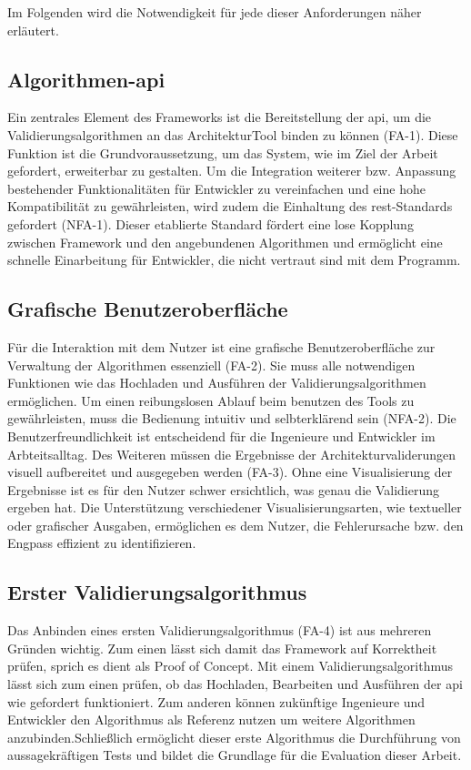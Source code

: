Im Folgenden wird die Notwendigkeit für jede dieser Anforderungen näher erläutert.

\subsection*{Algorithmen-\gls{api}}

Ein zentrales Element des Frameworks ist die Bereitstellung der \gls{api}, um die Validierungsalgorithmen an das ArchitekturTool binden zu können (FA-1). Diese Funktion ist die Grundvoraussetzung, um das System, wie im Ziel der Arbeit gefordert, erweiterbar zu gestalten. Um die Integration weiterer bzw. Anpassung bestehender Funktionalitäten für Entwickler zu vereinfachen und eine hohe Kompatibilität zu gewährleisten, wird zudem die Einhaltung des \gls{rest}-Standards gefordert (NFA-1). Dieser etablierte Standard fördert eine lose Kopplung zwischen Framework und den angebundenen Algorithmen und ermöglicht eine schnelle Einarbeitung für Entwickler, die nicht vertraut sind mit dem Programm.

\subsection*{Grafische Benutzeroberfläche}

Für die Interaktion mit dem Nutzer ist eine grafische Benutzeroberfläche zur Verwaltung der Algorithmen essenziell (FA-2). Sie muss alle notwendigen Funktionen wie das Hochladen und Ausführen der Validierungsalgorithmen ermöglichen. Um einen reibungslosen Ablauf beim benutzen des Tools zu gewährleisten, muss die Bedienung intuitiv und selbterklärend sein (NFA-2). Die Benutzerfreundlichkeit ist entscheidend für die Ingenieure und Entwickler im Arbteitsalltag. Des Weiteren müssen die Ergebnisse der Architekturvaliderungen visuell aufbereitet und ausgegeben werden (FA-3). Ohne eine Visualisierung der Ergebnisse ist es für den Nutzer schwer ersichtlich, was genau die Validierung ergeben hat. Die Unterstützung verschiedener Visualisierungsarten, wie textueller oder grafischer Ausgaben, ermöglichen es dem Nutzer, die Fehlerursache bzw. den Engpass effizient zu identifizieren.

\subsection*{Erster Validierungsalgorithmus}

Das Anbinden eines ersten Validierungsalgorithmus (FA-4) ist aus mehreren Gründen wichtig. Zum einen lässt sich damit das Framework auf Korrektheit prüfen, sprich es dient als Proof of Concept. Mit einem Validierungsalgorithmus lässt sich zum einen prüfen, ob das Hochladen, Bearbeiten und Ausführen der \gls{api} wie gefordert funktioniert. Zum anderen können  zukünftige Ingenieure und Entwickler den Algorithmus als Referenz nutzen um weitere Algorithmen anzubinden.Schließlich ermöglicht dieser erste Algorithmus die Durchführung von aussagekräftigen Tests und bildet die Grundlage für die Evaluation dieser Arbeit.

